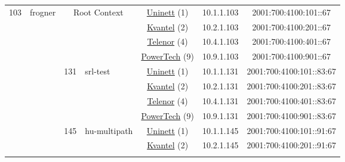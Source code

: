 \begin{small}
\begin{center}
\begin{longtable}{|c|c|c|c|c|c|c|c|}
 \multirow{20}{*}{\tiny{103}} & \multicolumn{1}{|l|}{\multirow{20}{*}{\tiny{frogner}}} & \multicolumn{2}{|c|}{\multirow{4}{*}{\tiny{Root Context}}} & \multicolumn{2}{|c|}{\tiny{\href{https://www.uninett.no}{Uninett} (1)}} & \tiny{10.1.1.103} & \tiny{2001:700:4100:101::67} \\* \cline{5-5}\cline{6-6}\cline{7-7}\cline{8-8}
  &  & \multicolumn{2}{|c|}{} & \multicolumn{2}{|c|}{\tiny{\href{http://kvantel.no}{Kvantel} (2)}} & \tiny{10.2.1.103} & \tiny{2001:700:4100:201::67} \\* \cline{5-5}\cline{6-6}\cline{7-7}\cline{8-8}
  &  & \multicolumn{2}{|c|}{} & \multicolumn{2}{|c|}{\tiny{\href{https://www.telenor.no}{Telenor} (4)}} & \tiny{10.4.1.103} & \tiny{2001:700:4100:401::67} \\* \cline{5-5}\cline{6-6}\cline{7-7}\cline{8-8}
  &  & \multicolumn{2}{|c|}{} & \multicolumn{2}{|c|}{\tiny{\href{http://www.powertech.no}{PowerTech} (9)}} & \tiny{10.9.1.103} & \tiny{2001:700:4100:901::67} \\* \cline{3-3}\cline{4-4}\cline{5-5}\cline{6-6}\cline{7-7}\cline{8-8}
  &  & \multirow{4}{*}{\tiny{131}} & \multicolumn{1}{|l|}{\multirow{4}{*}{\tiny{srl-test}}} & \multicolumn{2}{|c|}{\tiny{\href{https://www.uninett.no}{Uninett} (1)}} & \tiny{10.1.1.131} & \tiny{2001:700:4100:101::83:67} \\* \cline{5-5}\cline{6-6}\cline{7-7}\cline{8-8}
  &  &  &  & \multicolumn{2}{|c|}{\tiny{\href{http://kvantel.no}{Kvantel} (2)}} & \tiny{10.2.1.131} & \tiny{2001:700:4100:201::83:67} \\* \cline{5-5}\cline{6-6}\cline{7-7}\cline{8-8}
  &  &  &  & \multicolumn{2}{|c|}{\tiny{\href{https://www.telenor.no}{Telenor} (4)}} & \tiny{10.4.1.131} & \tiny{2001:700:4100:401::83:67} \\* \cline{5-5}\cline{6-6}\cline{7-7}\cline{8-8}
  &  &  &  & \multicolumn{2}{|c|}{\tiny{\href{http://www.powertech.no}{PowerTech} (9)}} & \tiny{10.9.1.131} & \tiny{2001:700:4100:901::83:67} \\* \cline{3-3}\cline{4-4}\cline{5-5}\cline{6-6}\cline{7-7}\cline{8-8}
  &  & \multirow{4}{*}{\tiny{145}} & \multicolumn{1}{|l|}{\multirow{4}{*}{\tiny{hu-multipath}}} & \multicolumn{2}{|c|}{\tiny{\href{https://www.uninett.no}{Uninett} (1)}} & \tiny{10.1.1.145} & \tiny{2001:700:4100:101::91:67} \\* \cline{5-5}\cline{6-6}\cline{7-7}\cline{8-8}
  &  &  &  & \multicolumn{2}{|c|}{\tiny{\href{http://kvantel.no}{Kvantel} (2)}} & \tiny{10.2.1.145} & \tiny{2001:700:4100:201::91:67} \\* \cline{5-5}\cline{6-6}\cline{7-7}\cline{8-8}

\end{longtable}
\end{center}
\end{small}
